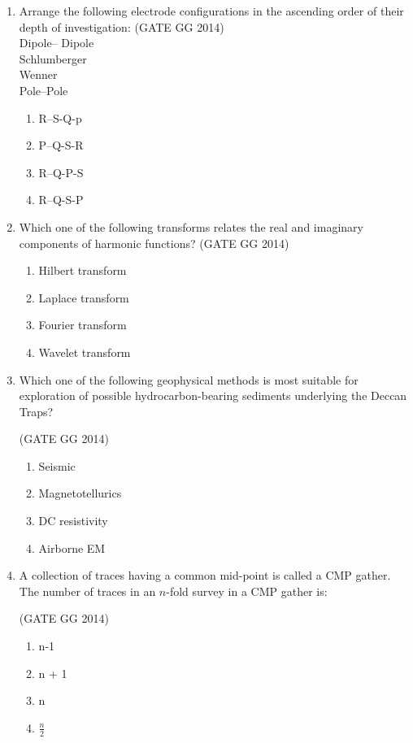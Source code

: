 \documentclass[journal]{IEEEtran}
\begin{document}
\begin{enumerate}[start=26]
\item Arrange the following electrode configurations in the ascending order of their depth of investigation:
\hfill(GATE GG 2014)\\
 Dipole-- Dipole\\  
  Schlumberger\\  
  Wenner\\  
  Pole--Pole\\  
\begin{enumerate}
\item R--S-Q-p
\item P--Q-S-R
\item R--Q-P-S
\item R--Q-S-P
 \end{enumerate}

 \item Which one of the following transforms relates the real and imaginary components of harmonic functions?
 \hfill(GATE GG 2014)
\begin{multicols}{2}
    \begin{enumerate}
    \item Hilbert transform
    \item Laplace transform
    \item Fourier transform
    \item Wavelet transform
\end{enumerate}
\end{multicols}

\item Which one of the following geophysical methods is most suitable for exploration of possible hydrocarbon-bearing sediments underlying the Deccan Traps?

\hfill(GATE GG 2014)
\begin{multicols}{2}
    \begin{enumerate}
    \item Seismic
    \item Magnetotellurics
    \item DC resistivity
    \item Airborne EM
\end{enumerate}
\end{multicols}

\item A collection of traces having a common mid-point is called a CMP gather. The number of traces in an $n$-fold survey in a CMP gather is:

\hfill(GATE GG 2014)
\begin{multicols}{4}
    \begin{enumerate}
    \item n-1
    \item  n + 1
    \item  n 
    \item  $\frac{n}{2}$ 
\end{enumerate}
\end{multicols}


\end{enumerate}
\end{document}

